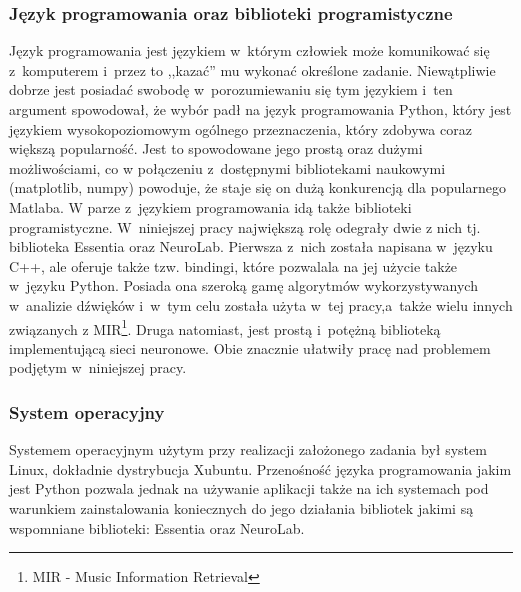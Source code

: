 \subsubsection{Język programowania oraz biblioteki programistyczne}
Język programowania jest językiem w~którym człowiek może komunikować się z~komputerem i~przez to ,,kazać'' mu wykonać  określone zadanie. Niewątpliwie dobrze jest posiadać swobodę w~porozumiewaniu się tym językiem i~ten argument spowodował, że wybór padł na język programowania Python, który jest językiem wysokopoziomowym ogólnego przeznaczenia, który zdobywa coraz większą popularność. Jest to spowodowane jego prostą oraz dużymi możliwościami, co w połączeniu z~dostępnymi bibliotekami naukowymi (matplotlib, numpy) powoduje, że staje się on dużą konkurencją dla popularnego Matlaba. W parze z~językiem programowania idą także biblioteki programistyczne. W~niniejszej pracy największą rolę odegrały dwie z nich tj. biblioteka Essentia\cite{essentia} oraz NeuroLab. Pierwsza z~nich została napisana w~języku C++, ale oferuje także tzw. bindingi, które pozwalala na jej użycie także w~języku Python. Posiada ona szeroką gamę algorytmów wykorzystywanych w~analizie dźwięków i~w~tym celu została użyta w~tej pracy,a~także wielu innych związanych z MIR\footnote{MIR - Music Information Retrieval}. Druga natomiast, jest prostą i~potężną biblioteką implementującą sieci neuronowe. Obie znacznie ułatwiły pracę nad problemem podjętym w~niniejszej pracy.

\subsubsection{System operacyjny}
Systemem operacyjnym użytym przy realizacji założonego zadania był system Linux, dokładnie dystrybucja Xubuntu. Przenośność języka programowania jakim jest Python pozwala jednak na używanie aplikacji także na ich systemach pod warunkiem zainstalowania koniecznych do jego działania bibliotek jakimi są wspomniane biblioteki: Essentia oraz NeuroLab.

